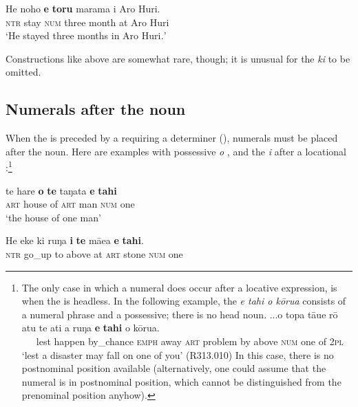 \ea\label{ex:5.62}
\gll He noho \textbf{e} \textbf{toru} marama {\ꞌ}i Aro Huri. \\
\textsc{ntr} stay \textsc{num} three month at Aro Huri \\

\glt 
‘He stayed three months in Aro Huri\textit{.}’ \textstyleExampleref{[MsE-109.013]}
\z

Constructions like  above are somewhat rare, though; it is unusual for the  \textit{ki} to be omitted. 

\subsection{Numerals after the noun}\label{sec:5.4.2}
When the  is preceded by a  requiring a determiner (), numerals must be placed after the noun. Here are examples with possessive \textit{o} , and the  \textit{i} after a locational :\footnote{\label{fn:259}The only case in which a numeral does occur after a locative expression, is when the  is headless. In the following example, the  \textit{e tahi o kōrua} consists of a numeral phrase and a possessive; there is no head noun.
\ea
\gll 
...{\ꞌ}o topa tā{\ꞌ}ue rō atu te {\ꞌ}ati a ruŋa \textbf{e} \textbf{tahi} o kōrua.\\
  ~~~lest happen by\_chance \textsc{emph} away \textsc{art} problem by above \textsc{num} one of \textsc{2pl} \\
  \glt 
  ‘lest a disaster may fall on one of you’ (R313.010) \z
In this case, there is no postnominal position available (alternatively, one could assume that the numeral is in postnominal position, which cannot be distinguished from the prenominal position anyhow).}

\ea\label{ex:5.63}
\gll te hare \textbf{o} \textbf{te} taŋata \textbf{e} \textbf{tahi} \\
\textsc{art} house of \textsc{art} man \textsc{num} one \\

\glt 
‘the house of one man’ \textstyleExampleref{[Notes]}
\z

\ea\label{ex:5.64}
\gll He eke ki ruŋa \textbf{i} \textbf{te} mā{\ꞌ}ea \textbf{e} \textbf{tahi}.\\
\textsc{ntr} go\_up to above at \textsc{art} stone \textsc{num} one\\

